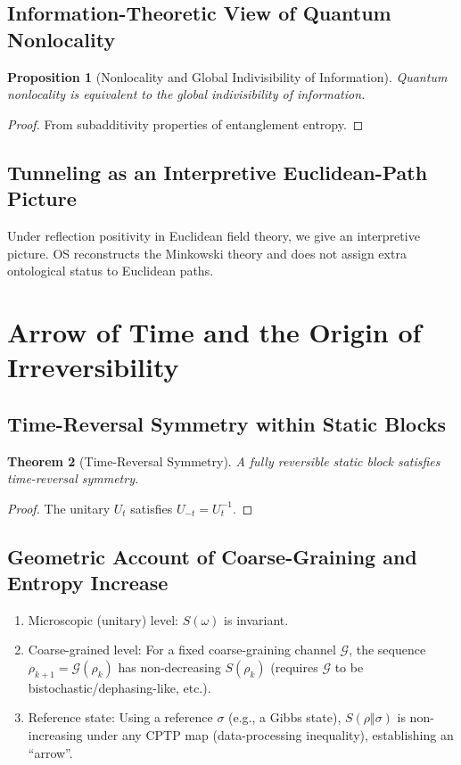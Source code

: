 \documentclass[11pt]{article}
\newtheorem{theorem}{Theorem}[section]
\newtheorem{proposition}[theorem]{Proposition}
\theoremstyle{definition}
\theoremstyle{remark}
\begin{document}
\subsection{Information-Theoretic View of Quantum Nonlocality}

\begin{proposition}[Nonlocality and Global Indivisibility of Information]\label{prop:nonlocality}
Quantum nonlocality is equivalent to the global indivisibility of information.
\end{proposition}

\begin{proof}
From subadditivity properties of entanglement entropy.
\end{proof}

\subsection{Tunneling as an Interpretive Euclidean-Path Picture}

Under reflection positivity in Euclidean field theory, we give an interpretive picture. OS reconstructs the Minkowski theory and does not assign extra ontological status to Euclidean paths.

\section{Arrow of Time and the Origin of Irreversibility}\label{sec:arrow}

\subsection{Time-Reversal Symmetry within Static Blocks}

\begin{theorem}[Time-Reversal Symmetry]\label{thm:timereversal}
A fully reversible static block satisfies time-reversal symmetry.
\end{theorem}

\begin{proof}
The unitary \( U_t \) satisfies \( U_{-t}=U_t^{-1} \).
\end{proof}

\subsection{Geometric Account of Coarse-Graining and Entropy Increase}

\begin{enumerate}
\item Microscopic (unitary) level: \( S(\omega) \) is invariant.
\item Coarse-grained level: For a fixed coarse-graining channel \( \mathcal{G} \), the sequence \( \rho_{k+1}=\mathcal{G}(\rho_k) \) has non-decreasing \( S(\rho_k) \) (requires \( \mathcal{G} \) to be bistochastic/dephasing-like, etc.).
\item Reference state: Using a reference \( \sigma \) (e.g., a Gibbs state), \( S(\rho\Vert\sigma) \) is non-increasing under any CPTP map (data-processing inequality), establishing an ``arrow''.
\end{enumerate}
\end{document}
